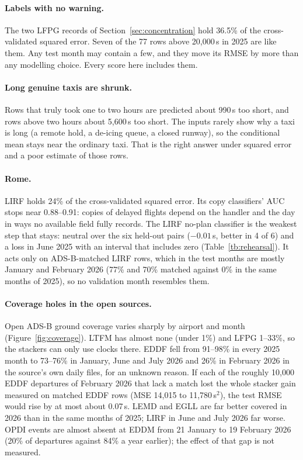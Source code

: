 \documentclass[
  manuscript=article,
  layout=preprint,
  year=2026,
  volume=x,
]{extra/joas}
\begin{document}
\paragraph{Labels with no warning.} The two LFPG records of Section~\ref{sec:concentration} hold 36.5\% of the cross-validated squared
error. Seven of the 77 rows above 20,000\,s in 2025 are like them. Any test month may contain a few, and they move its RMSE by more than any
modelling choice. Every score here includes them.

\paragraph{Long genuine taxis are shrunk.} Rows that truly took one to two hours are predicted about 990\,s too short, and rows above two
hours about 5,600\,s too short. The inputs rarely show why a taxi is long (a remote hold, a de-icing queue, a closed runway), so the
conditional mean stays near the ordinary taxi. That is the right answer under squared error and a poor estimate of those rows.

\paragraph{Rome.} LIRF holds 24\% of the cross-validated squared error. Its copy classifiers' AUC stops near 0.88--0.91: copies of delayed
flights depend on the handler and the day in ways no available field fully records. The LIRF no-plan classifier is the weakest step that
stays: neutral over the six held-out pairs ($-0.01$\,s, better in 4 of 6) and a loss in June 2025 with an interval that includes zero
(Table~\ref{tb:rehearsal}). It acts only on ADS-B-matched LIRF rows, which in the test months are mostly January and February 2026 (77\%
and 70\% matched against 0\% in the same months of 2025), so no validation month resembles them.

\paragraph{Coverage holes in the open sources.} Open ADS-B ground coverage varies sharply by airport and month (Figure~\ref{fig:coverage}).
LTFM has almost none (under 1\%) and LFPG 1--33\%, so the stackers can only use clocks there. EDDF fell from 91--98\% in every 2025 month to
73--76\% in January, June and July 2026 and 26\% in February 2026 in the source's own daily files, for an unknown reason. If each of the
roughly 10,000 EDDF departures of February 2026 that lack a match lost the whole stacker gain measured on matched EDDF rows (MSE 14,015 to
11,780\,s$^2$), the test RMSE would rise by at most about 0.07\,s. LEMD and EGLL are far better covered in 2026 than in the same months of
2025; LIRF in June and July 2026 far worse. OPDI events are almost absent at EDDM from 21 January to 19 February 2026 (20\% of departures
against 84\% a year earlier); the effect of that gap is not measured.
\end{document}
